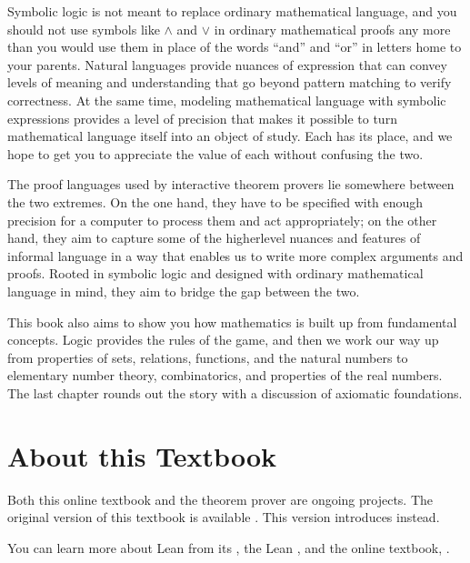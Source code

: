 \documentclass[letterpaper,10pt,english]{sphinxmanual}
\begin{document}
\sphinxAtStartPar
Symbolic logic is not meant to replace ordinary mathematical language, and you should not use symbols like \(\wedge\) and \(\vee\) in ordinary mathematical proofs any more than you would use them in place of the words “and” and “or” in letters home to your parents. Natural languages provide nuances of expression that can convey levels of meaning and understanding that go beyond pattern matching to verify correctness. At the same time, modeling mathematical language with symbolic expressions provides a level of precision that makes it possible to turn mathematical language itself into an object of study. Each has its place, and we hope to get you to appreciate the value of each without confusing the two.

\sphinxAtStartPar
The proof languages used by interactive theorem provers lie somewhere between the two extremes. On the one hand, they have to be specified with enough precision for a computer to process them and act appropriately; on the other hand, they aim to capture some of the higher\sphinxhyphen{}level nuances and features of informal language in a way that enables us to write more complex arguments and proofs. Rooted in symbolic logic and designed with ordinary mathematical language in mind, they aim to bridge the gap between the two.

\sphinxAtStartPar
This book also aims to show you how mathematics is built up from fundamental concepts. Logic provides the rules of the game, and then we work our way up from properties of sets, relations, functions, and the natural numbers to elementary number theory, combinatorics, and properties of the real numbers. The last chapter rounds out the story with a discussion of axiomatic foundations.


\section{About this Textbook}
\label{\detokenize{introduction:about-this-textbook}}
\sphinxAtStartPar
Both this online textbook and the  theorem prover are ongoing projects.
The original  version of this textbook
is available .
This version introduces  instead.

\sphinxAtStartPar
You can learn more about Lean from its ,
the Lean , and the online textbook,
.
\end{document}
